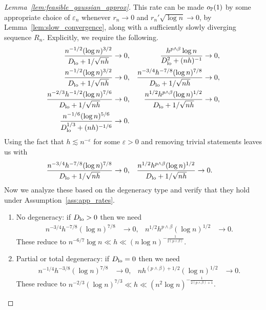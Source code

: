 \begin{proof}[Lemma~\ref{lem:feasible_gaussian_approx}]

  This rate can be made $o_\P(1)$
  by some appropriate choice of $\varepsilon_n$
  whenever
  $r_n \to 0$
  and
  $r_n' \sqrt{\log n} \to 0$,
  by Lemma~\ref{lem:slow_convergence}, along with
  a sufficiently slowly diverging sequence $R_n$.
  Explicitly, we require the following.
  \begin{align*}
    \frac{n^{-1/2} (\log n)^{3/2}}{\Dl + 1/\sqrt{n h}}
    &\to 0,
    &\frac{h^{p \wedge \beta} \log n}{\Dl^2 + (n h)^{-1}}
    &\to 0, \\
    \frac{n^{-1/2} (\log n)^{3/2}}
    {\Dl + 1/\sqrt{n h}}
    &\to 0,
    &\frac{n^{-3/4} h^{-7/8} (\log n)^{7/8}}
    {\Dl + 1/\sqrt{n h}}
    &\to 0, \\
    \frac{n^{-2/3} h^{-1/2} (\log n)^{7/6}}
    {\Dl + 1/\sqrt{n h}}
    &\to 0,
    &\frac{n^{1/2} h^{p \wedge \beta} (\log n)^{1/2}}
    {\Dl + 1/\sqrt{n h}}
    &\to 0, \\
    \frac{n^{-1/6}(\log n)^{5/6}}
    {\Dl^{1/3} + (n h)^{-1/6}}
    &\to 0.
  \end{align*}
  Using the fact that $h \lesssim n^{-\varepsilon}$
  for some $\varepsilon > 0$
  and removing trivial statements leaves us with
  \begin{align*}
    \frac{n^{-3/4} h^{-7/8} (\log n)^{7/8}}
    {\Dl + 1/\sqrt{n h}}
    &\to 0,
    &\frac{n^{1/2} h^{p \wedge \beta} (\log n)^{1/2}}
    {\Dl + 1/\sqrt{n h}}
    &\to 0.
  \end{align*}
  Now we analyze these based on the degeneracy type
  and verify that they hold under
  Assumption~\ref{ass:app_rates}.
  \begin{enumerate}[label=(\roman*)]

    \item No degeneracy:
      if $\Dl > 0$ then we need
      \begin{align*}
        n^{-3/4} h^{-7/8} (\log n)^{7/8}
        &\to 0,
        &n^{1/2} h^{p \wedge \beta} (\log n)^{1/2}
        &\to 0.
      \end{align*}
      These reduce to
      $n^{-6/7} \log n \ll h
      \ll (n \log n)^{-\frac{1}{2(p \wedge \beta)}}$.

    \item Partial or total degeneracy:
      if $\Dl = 0$ then we need
      \begin{align*}
        n^{-1/4} h^{-3/8} (\log n)^{7/8}
        &\to 0,
        &n h^{(p \wedge \beta) + 1/2} (\log n)^{1/2}
        &\to 0.
      \end{align*}
      These reduce to
      $n^{-2/3} (\log n)^{7/3} \ll h
      \ll (n^2 \log n)^{-\frac{1}{2(p \wedge \beta) + 1}}$.

  \end{enumerate}
\end{proof}

